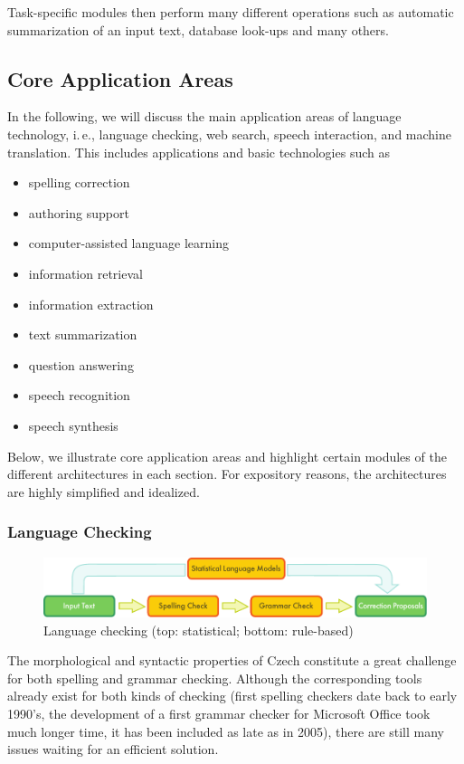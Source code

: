 \begin{multicols}{2}
Task-specific modules then perform many different operations such as automatic summarization of an input text, database look-ups and many others.
  
\subsection{Core Application Areas}
In the following, we will discuss the main application areas of language technology, i.\,e., language checking, web search, speech interaction, and machine translation. This includes applications and basic technologies such as

\begin{itemize}
\item spelling correction
\item authoring support
\item computer-assisted language learning
\item information retrieval
\item information extraction
\item text summarization
\item question answering
\item speech recognition
\item speech synthesis
\end{itemize}

Below, we illustrate core application areas and highlight certain modules of the different architectures in each section. For expository reasons, the architectures are highly simplified and idealized.

\subsubsection{Language Checking}

\begin{figure}[t]
  \center
  \includegraphics[width=\textwidth]{../_media/english/language_checking}
  \caption{Language checking (top: statistical; bottom: rule-based)}
  \label{fig:langcheckingaarch_en}
\end{figure}

The morphological and syntactic properties of Czech constitute a great challenge for both spelling and grammar checking. Although the corresponding tools already exist for both kinds of checking (first spelling checkers date back to early 1990’s, the development of a first grammar checker for Microsoft Office took much longer time, it has been included as late as in 2005), there are still many issues waiting for an efficient solution.


\end{multicols}
